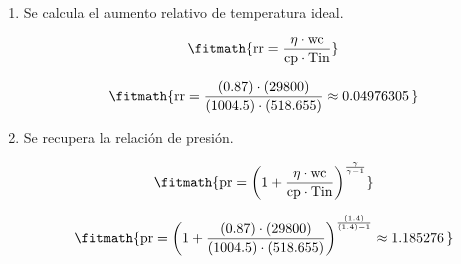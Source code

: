 \begin{enumerate}

\item Se calcula el aumento relativo de temperatura ideal.

\[\fitmath{\mathrm{rr}=\frac{\eta\cdot \mathrm{wc}}{\mathrm{cp}\cdot \mathrm{Tin}}}\]

\[\fitmath{\mathrm{rr}=\frac{(0.87)\cdot (29800)}{(1004.5)\cdot (518.655)}\approx 0.04976305\,}\]

\item Se recupera la relación de presión.

\[\fitmath{\mathrm{pr}={\left(1+\frac{\eta\cdot \mathrm{wc}}{\mathrm{cp}\cdot \mathrm{Tin}}\right)}^{\frac{\gamma}{\gamma-1}}}\]

\[\fitmath{\mathrm{pr}={\left(1+\frac{(0.87)\cdot (29800)}{(1004.5)\cdot (518.655)}\right)}^{\frac{(1.4)}{(1.4)-1}}\approx 1.185276\,}\]

\end{enumerate}
